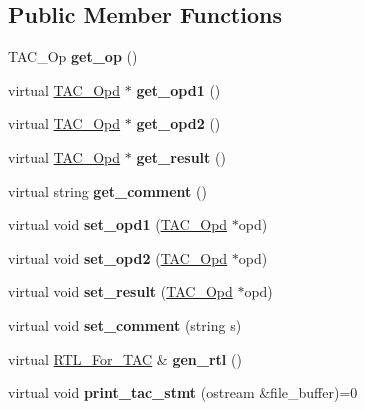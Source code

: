 \subsection*{Public Member Functions}
\begin{DoxyCompactItemize}
\item 
\mbox{\label{classTAC__Stmt_abe8c6011405b20eca36d4156f74df06e}} 
T\+A\+C\+\_\+\+Op {\bfseries get\+\_\+op} ()
\item 
\mbox{\label{classTAC__Stmt_a9f5cdd872d0558f1d227825a532a5a9a}} 
virtual \hyperlink{classTAC__Opd}{T\+A\+C\+\_\+\+Opd} $\ast$ {\bfseries get\+\_\+opd1} ()
\item 
\mbox{\label{classTAC__Stmt_a3b0a66560ea1f6623e2e356b68845e26}} 
virtual \hyperlink{classTAC__Opd}{T\+A\+C\+\_\+\+Opd} $\ast$ {\bfseries get\+\_\+opd2} ()
\item 
\mbox{\label{classTAC__Stmt_ae9fe659d16f02ca1bba65a79b3ab26db}} 
virtual \hyperlink{classTAC__Opd}{T\+A\+C\+\_\+\+Opd} $\ast$ {\bfseries get\+\_\+result} ()
\item 
\mbox{\label{classTAC__Stmt_a73aff560dfa67f433a182313be4b0e19}} 
virtual string {\bfseries get\+\_\+comment} ()
\item 
\mbox{\label{classTAC__Stmt_ad655b0c0f26e4afa7c1c966430155a0d}} 
virtual void {\bfseries set\+\_\+opd1} (\hyperlink{classTAC__Opd}{T\+A\+C\+\_\+\+Opd} $\ast$opd)
\item 
\mbox{\label{classTAC__Stmt_ab971b39c0d1b75d79b3dcb41217afd0c}} 
virtual void {\bfseries set\+\_\+opd2} (\hyperlink{classTAC__Opd}{T\+A\+C\+\_\+\+Opd} $\ast$opd)
\item 
\mbox{\label{classTAC__Stmt_a32f92ea3f240b6a60fe9098242832f5a}} 
virtual void {\bfseries set\+\_\+result} (\hyperlink{classTAC__Opd}{T\+A\+C\+\_\+\+Opd} $\ast$opd)
\item 
\mbox{\label{classTAC__Stmt_aebe66ba3d29f83786e479a6b038c1082}} 
virtual void {\bfseries set\+\_\+comment} (string s)
\item 
\mbox{\label{classTAC__Stmt_a5954e4603b9c15a727a7efab594ad654}} 
virtual \hyperlink{classRTL__For__TAC}{R\+T\+L\+\_\+\+For\+\_\+\+T\+AC} \& {\bfseries gen\+\_\+rtl} ()
\item 
\mbox{\label{classTAC__Stmt_a62a5b0f43acfbf40969262d508ce6525}} 
virtual void {\bfseries print\+\_\+tac\+\_\+stmt} (ostream \&file\+\_\+buffer)=0
\end{DoxyCompactItemize}
